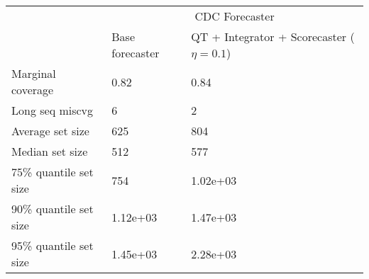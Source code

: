 \begin{tabular}{lll}
\toprule
& \multicolumn{2}{c}{CDC Forecaster} \\
& Base forecaster & QT + Integrator + Scorecaster ($\eta=0.1$) \\
\midrule
Marginal coverage & 0.82 & 0.84 \\
Long seq miscvg & 6 & 2 \\
Average set size & 625 & 804 \\
Median set size & 512 & 577 \\
75\% quantile set size & 754 & 1.02e+03 \\
90\% quantile set size & 1.12e+03 & 1.47e+03 \\
95\% quantile set size & 1.45e+03 & 2.28e+03 \\
\bottomrule
\end{tabular}
